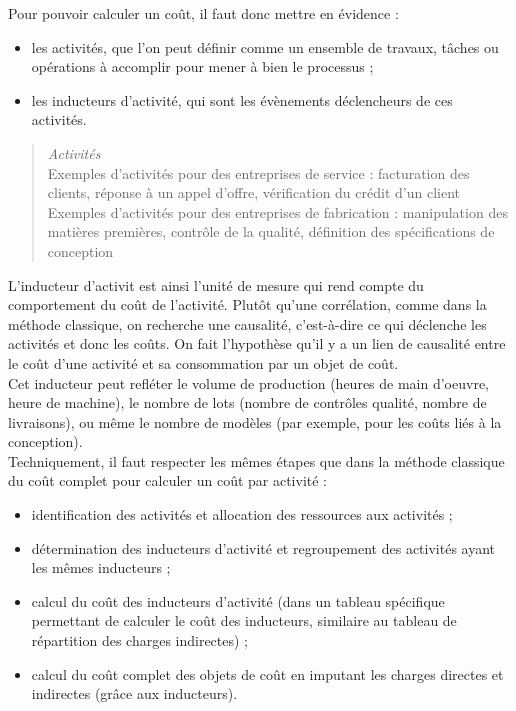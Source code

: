 \documentclass{tufte-handout}
\begin{document}
\begin{enumerate}
Pour pouvoir calculer un coût, il faut donc mettre en évidence :\\
\begin{itemize}
\item les activités, que l'on peut définir comme un ensemble de travaux, tâches ou opérations à accomplir pour mener à bien le processus ;\\
\item les inducteurs d'activité, qui sont les évènements déclencheurs de ces activités.\\
\end{itemize}

\begin{quote}
\emph{Activités}\\
Exemples d'activités pour des entreprises de service : facturation des clients, réponse à un appel d’offre, vérification du crédit d’un client\\
Exemples d'activités pour des entreprises de fabrication : manipulation des matières premières, contrôle de la qualité, définition des spécifications de conception\\
\end{quote}

L'inducteur d'activit est ainsi l'unité de mesure qui rend compte du comportement du coût de l’activité. Plutôt qu'une corrélation, comme dans la méthode classique, on recherche une causalité, c'est-à-dire ce qui déclenche les activités et donc les coûts. On fait l'hypothèse qu'il y a un lien de causalité entre le coût d’une activité et sa consommation par un objet de coût.\\

Cet inducteur peut refléter le volume de production (heures de main d'oeuvre, heure de machine), le nombre de lots (nombre de contrôles qualité, nombre de livraisons), ou même le nombre de modèles (par exemple, pour les coûts liés à la conception).\\

Techniquement, il faut respecter les mêmes étapes que dans la méthode classique du coût complet pour calculer un coût par activité :\\
\begin{itemize}
\item identification des activités et allocation des ressources aux activités ;\\
\item détermination des inducteurs d’activité et regroupement des activités ayant les mêmes inducteurs ;\\
\item calcul du coût des inducteurs d’activité (dans un tableau spécifique permettant de calculer le coût des inducteurs, similaire au tableau de répartition des charges indirectes) ;\\
\item calcul du coût complet des objets de coût en imputant les charges directes et indirectes (grâce aux inducteurs).\\
\end{itemize}


\end{enumerate}
\end{document}
